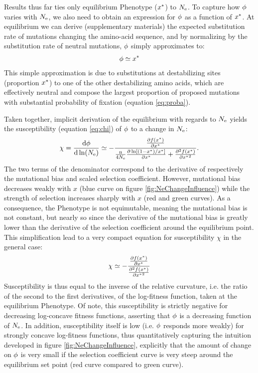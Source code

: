 Results thus far ties only equilibrium \gls{Phenotype} ($x^{*}$) to $N_{\mathrm{e}}$.
To capture how $\phi$ varies with $N_{\mathrm{e}}$, we also need to obtain an expression for $\phi$ as a function of $x^{*}$.
At equilibrium we can derive (supplementary materials) the expected \gls{substitution} rate of mutations changing the amino-acid sequence, and by normalizing by the \gls{substitution} rate of \gls{neutral} mutations, $\phi$ simply approximates to:
\begin{gather}
    \avgpfix \simeq x\eq \label{eq:dnds}
\end{gather}
This simple approximation is due to \glspl{substitution} at destabilizing sites (proportion $x^{*}$) to one of the other destabilizing amino acids, which are effectively \gls{neutral} and compose the largest proportion of proposed mutations with substantial probability of fixation (equation \ref{eq:proba}).

Taken together, implicit derivation of the equilibrium with regards to $N_{\mathrm{e}}$ yields the susceptibility (equation \ref{eq:chi}) of $\phi$ to a change in $N_{\mathrm{e}}$:
\begin{gather}
    \chi = \frac{ \mathrm{d} \phi}{\mathrm{d} \ln (N_{\mathrm{e}})} \simeq - \frac{\frac{ \partial f (x^{*}) }{\partial {x^{*}}}}{\frac{\text{n}}{4 N_{\mathrm{e}}} \frac{\partial \ln [ (1 - x^{*}) / x^{*} ]}{\partial x^{*} } + \frac{ \partial^2 f (x^{*}) }{\partial {x^{*}}^2}}.
\end{gather}
The two terms of the denominator correspond to the derivative of respectively the mutational bias and scaled selection coefficient.
However, mutational bias decreases weakly with $x$ (blue curve on figure \ref{fig:NeChangeInfluence}) while the strength of selection increases sharply with $x$ (red and green curves).
As a consequence, the \gls{Phenotype} is not equimutable, meaning the mutational bias is not constant, but nearly so since the derivative of the mutational bias is greatly lower than the derivative of the selection coefficient around the equilibrium point.
This simplification lead to a very compact equation for susceptibility $\chi$ in the general case:
\begin{gather}
    \chi \simeq - \frac{\frac{ \partial f (x^{*}) }{\partial {x^{*}}}}{\frac{ \partial^2 f (x^{*}) }{\partial {x^{*}}^2}}
\end{gather}
Susceptibility is thus equal to the inverse of the relative curvature, i.e. the ratio of the second to the first derivatives, of the log-fitness function, taken at the equilibrium \gls{Phenotype}.
Of note, this susceptibility is strictly negative for decreasing log-concave fitness functions, asserting that $\phi$ is a decreasing function of $N_{\mathrm{e}}$.
In addition, susceptibility itself is low (i.e. $\phi$ responds more weakly) for strongly concave log-fitness functions, thus quantitatively capturing the intuition developed in figure \ref{fig:NeChangeInfluence}, explicitly that the amount of change on $\phi$ is very small if the selection coefficient curve is very steep around the equilibrium set point (red curve compared to green curve).

